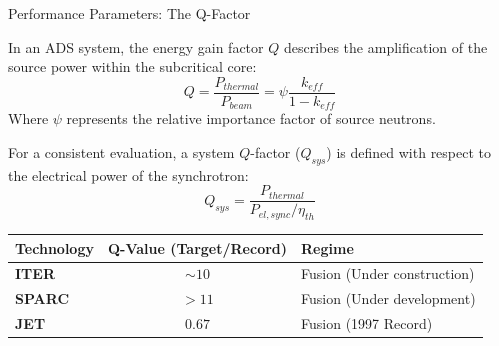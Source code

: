 \documentclass[aspectratio=169]{beamer}
\begin{document}
\begin{frame}{Performance Parameters: The Q-Factor}
    
    In an ADS system, the energy gain factor $Q$ describes the amplification of the source power within the subcritical core:
    \begin{equation*}
        Q = \frac{P_{thermal}}{P_{beam}} = \psi \frac{k_{eff}}{1 - k_{eff}}
    \end{equation*}
    Where $\psi$ represents the relative importance factor of source neutrons.
    
    For a consistent evaluation, a system $Q$-factor ($Q_{sys}$) is defined with respect to the electrical power of the synchrotron:
    \begin{equation*}
        Q_{sys} = \frac{P_{thermal}}{P_{el, sync} / \eta_{th}}
    \end{equation*}

    \begin{table}
        \centering
        \small
        \begin{tabular}{l | c | l}
            \textbf{Technology} & \textbf{Q-Value (Target/Record)} & \textbf{Regime} \\
            \hline
            \textbf{ITER} & $\sim 10$ & Fusion (Under construction) \\
            \textbf{SPARC} & $> 11$ & Fusion (Under development) \\
            \textbf{JET} & $0.67$ & Fusion (1997 Record) \\
        \end{tabular}
    \end{table}
\end{frame}
\end{document}
